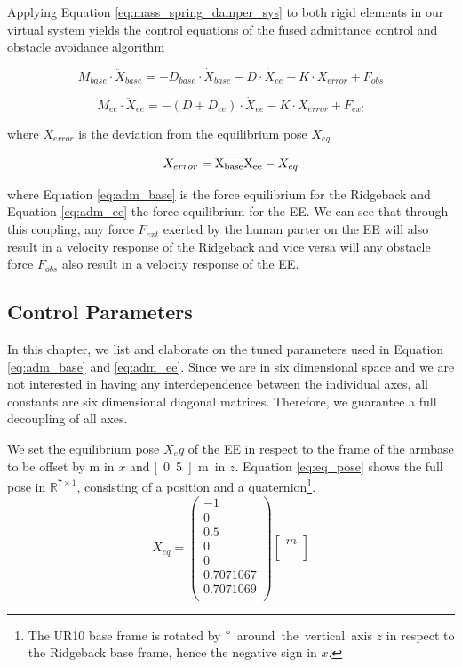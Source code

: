 Applying Equation \ref{eq:mass_spring_damper_sys} to both rigid elements in our virtual system yields the control equations of the fused admittance control and obstacle avoidance algorithm

\begin{equation}
M_{base} \cdot \ddot{X}_{base} = -D_{base} \cdot \dot{X}_{base} - D \cdot \dot{X}_{ee} + K \cdot X_{error}+F_{obs}
	\label{eq:adm_base}
\end{equation}

\begin{equation}
M_{ee} \cdot \ddot{X}_{ee} = -(D + D_{ee}) \cdot \dot{X}_{ee} - K \cdot X_{error}+F_{ext}
	\label{eq:adm_ee}
\end{equation}

where $X_{error}$ is the deviation from the equilibrium pose $X_{eq}$

\begin{equation}
X_{error} = \overline{\rm X_{base}X_{ee}} - X_{eq}
\end{equation}

where Equation \ref{eq:adm_base} is the force equilibrium for the Ridgeback and Equation \ref{eq:adm_ee} the force equilibrium for the EE. We can see that through this coupling, any force $F_{ext}$ exerted by the human parter on the EE will also result in a velocity response of the Ridgeback and vice versa will any obstacle force $F_{obs}$ also result in a velocity response of the EE.

\subsection{Control Parameters}
In this chapter, we list and elaborate on the tuned parameters used in Equation \ref{eq:adm_base} and \ref{eq:adm_ee}. Since we are in six dimensional space and we are not interested in having any interdependence between the individual axes, all constants are six dimensional diagonal matrices. Therefore, we guarantee a full decoupling of all axes.

We set the equilibrium pose $X_eq$ of the EE in respect to the frame of the armbase to be offset by \unit[1]{m} in $x$ and \unit[0.5]{m} in $z$. Equation \ref{eq:eq_pose} shows the full pose in $\mathbb{R}^{7 \times 1}$, consisting of a position and a quaternion\footnote{The UR10 base frame is rotated by \unit[180]{$\degree$} around the vertical axis $z$ in respect to the Ridgeback base frame, hence the negative sign in $x$.}.
\begin{equation}
X_{eq} = \begin{pmatrix}
-1 \\ 0 \\ 0.5 \\ 0 \\ 0 \\ 0.7071067 \\ 0.7071069 \\
\end{pmatrix} \begin{bmatrix}
m \\
- \\
\end{bmatrix}
	\label{eq:eq_pose}
\end{equation}

